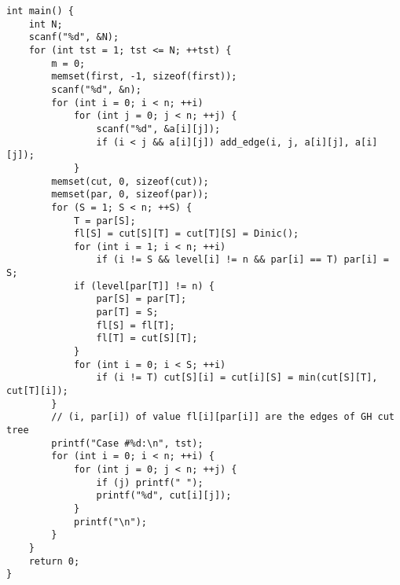 \begin{verbatim}
int main() {
    int N;
    scanf("%d", &N);
    for (int tst = 1; tst <= N; ++tst) {
        m = 0;
        memset(first, -1, sizeof(first));
        scanf("%d", &n);
        for (int i = 0; i < n; ++i)
            for (int j = 0; j < n; ++j) {
                scanf("%d", &a[i][j]);
                if (i < j && a[i][j]) add_edge(i, j, a[i][j], a[i][j]);
            }
        memset(cut, 0, sizeof(cut));
        memset(par, 0, sizeof(par));
        for (S = 1; S < n; ++S) {
            T = par[S];
            fl[S] = cut[S][T] = cut[T][S] = Dinic();
            for (int i = 1; i < n; ++i)
                if (i != S && level[i] != n && par[i] == T) par[i] = S;
            if (level[par[T]] != n) {
                par[S] = par[T];
                par[T] = S;
                fl[S] = fl[T];
                fl[T] = cut[S][T];
            }
            for (int i = 0; i < S; ++i)
                if (i != T) cut[S][i] = cut[i][S] = min(cut[S][T], cut[T][i]);
        }
        // (i, par[i]) of value fl[i][par[i]] are the edges of GH cut tree
        printf("Case #%d:\n", tst);
        for (int i = 0; i < n; ++i) {
            for (int j = 0; j < n; ++j) {
                if (j) printf(" ");
                printf("%d", cut[i][j]);
            }
            printf("\n");
        }
    }
    return 0;
}
\end{verbatim}
